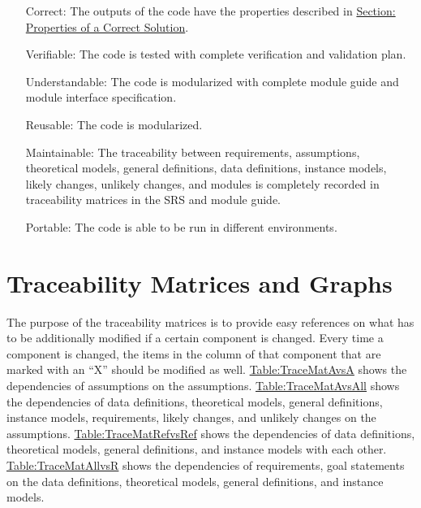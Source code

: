 \documentclass[12pt]{article}
\begin{document}
\begin{itemize}
\item[Correct:\phantomsection\label{correct}]{The outputs of the code have the properties described in \hyperref[Sec:CorSolProps]{Section: Properties of a Correct Solution}.}
\item[Verifiable:\phantomsection\label{verifiable}]{The code is tested with complete verification and validation plan.}
\item[Understandable:\phantomsection\label{understandable}]{The code is modularized with complete module guide and module interface specification.}
\item[Reusable:\phantomsection\label{reusable}]{The code is modularized.}
\item[Maintainable:\phantomsection\label{maintainable}]{The traceability between requirements, assumptions, theoretical models, general definitions, data definitions, instance models, likely changes, unlikely changes, and modules is completely recorded in traceability matrices in the SRS and module guide.}
\item[Portable:\phantomsection\label{portable}]{The code is able to be run in different environments.}
\end{itemize}
\section{Traceability Matrices and Graphs}
\label{Sec:TraceMatrices}
The purpose of the traceability matrices is to provide easy references on what has to be additionally modified if a certain component is changed. Every time a component is changed, the items in the column of that component that are marked with an ``X'' should be modified as well. \hyperref[Table:TraceMatAvsA]{Table:TraceMatAvsA} shows the dependencies of assumptions on the assumptions. \hyperref[Table:TraceMatAvsAll]{Table:TraceMatAvsAll} shows the dependencies of data definitions, theoretical models, general definitions, instance models, requirements, likely changes, and unlikely changes on the assumptions. \hyperref[Table:TraceMatRefvsRef]{Table:TraceMatRefvsRef} shows the dependencies of data definitions, theoretical models, general definitions, and instance models with each other. \hyperref[Table:TraceMatAllvsR]{Table:TraceMatAllvsR} shows the dependencies of requirements, goal statements on the data definitions, theoretical models, general definitions, and instance models.
\end{document}
